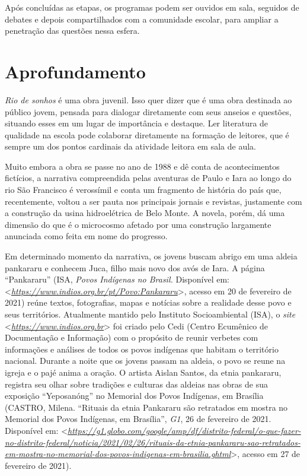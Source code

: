 \documentclass{extrarticle}
\begin{document}
  Após concluídas as etapas, os programas podem ser ouvidos em sala,
  seguidos de debates e depois compartilhados com a comunidade escolar,
  para ampliar a penetração das questões nessa esfera.

  \section{Aprofundamento}

  \emph{Rio de sonhos} é uma obra juvenil. Isso quer dizer que é uma
  obra destinada ao público jovem, pensada para dialogar diretamente com
  seus anseios e questões, situando esses em um lugar de importância e
  destaque. Ler literatura de qualidade na escola pode colaborar
  diretamente na formação de leitores, que é sempre um dos pontos
  cardinais da atividade leitora em sala de aula.

  Muito embora a obra se passe no ano de 1988 e dê conta de
  acontecimentos fictícios, a narrativa compreendida pelas aventuras de
  Paulo e Iara ao longo do rio São Francisco é verossímil e conta um
  fragmento de história do país que, recentemente, voltou a ser pauta
  nos principais jornais e revistas, justamente com a construção da
  usina hidroelétrica de Belo Monte. A novela, porém, dá uma dimensão do
  que é o microcosmo afetado por uma construção largamente anunciada
  como feita em nome do progresso.

  Em determinado momento da narrativa, os jovens buscam abrigo em uma
  aldeia pankararu e conhecem Juca, filho mais novo dos avós de Iara. A
  página ``Pankararu'' (ISA, \emph{Povos Indígenas no Brasil.}
  Disponível em:
  \textless{}\href{https://www.indios.org.br/pt/Povo:Pankararu}{\emph{https://www.indios.org.br/pt/Povo:Pankararu}}\textgreater{},
  acesso em 20 de fevereiro de 2021) reúne textos, fotografias, mapas e
  notícias sobre a realidade desse povo e seus territórios. Atualmente
  mantido pelo Instituto Socioambiental (ISA), o \emph{site}
  \textless{}\href{https://www.indios.org.br/}{\emph{https://www.indios.org.br}}\textgreater{}
  foi criado pelo Cedi (Centro Ecumênico de Documentação e Informação)
  com o propósito de reunir verbetes com informações e análises de todos
  os povos indígenas que habitam o território nacional. Durante a noite
  que os jovens passam na aldeia, o povo se reune na igreja e o pajé
  anima a oração. O artista Aislan Santos, da etnia pankararu, registra
  seu olhar sobre tradições e culturas das aldeias nas obras de sua
  exposição ``Yeposanóng'' no Memorial dos Povos Indígenas, em Brasília
  (CASTRO, Milena. ``Rituais da etnia Pankararu são retratados em mostra
  no Memorial dos Povos Indígenas, em Brasília'', \emph{G1}, 26 de
  fevereiro de 2021. Disponível em:
  \textless{}\href{https://g1.globo.com/google/amp/df/distrito-federal/o-que-fazer-no-distrito-federal/noticia/2021/02/26/rituais-da-etnia-pankararu-sao-retratados-em-mostra-no-memorial-dos-povos-indigenas-em-brasilia.ghtml}{\emph{https://g1.globo.com/google/amp/df/distrito-federal/o-que-fazer-no-distrito-federal/noticia/2021/02/26/rituais-da-etnia-pankararu-sao-retratados-em-mostra-no-memorial-dos-povos-indigenas-em-brasilia.ghtml}}\textgreater{},
  acesso em 27 de fevereiro de 2021).
\end{document}
